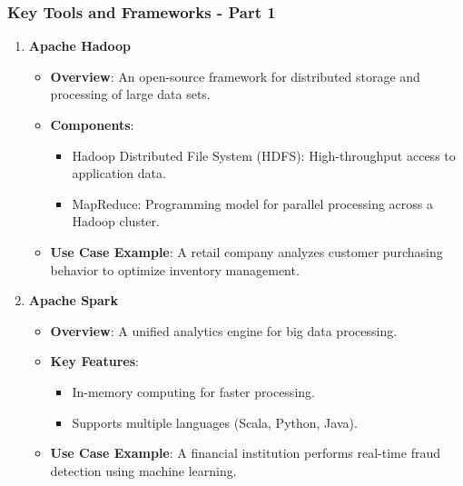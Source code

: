 \documentclass[aspectratio=169]{beamer}
\begin{document}
\begin{frame}[fragile]
    \frametitle{Key Tools and Frameworks - Part 1}
    \begin{enumerate}
        \item \textbf{Apache Hadoop}
        \begin{itemize}
            \item \textbf{Overview}: An open-source framework for distributed storage and processing of large data sets.
            \item \textbf{Components}:
            \begin{itemize}
                \item Hadoop Distributed File System (HDFS): High-throughput access to application data.
                \item MapReduce: Programming model for parallel processing across a Hadoop cluster.
            \end{itemize}
            \item \textbf{Use Case Example}: A retail company analyzes customer purchasing behavior to optimize inventory management.
        \end{itemize}

        \item \textbf{Apache Spark}
        \begin{itemize}
            \item \textbf{Overview}: A unified analytics engine for big data processing.
            \item \textbf{Key Features}:
            \begin{itemize}
                \item In-memory computing for faster processing.
                \item Supports multiple languages (Scala, Python, Java).
            \end{itemize}
            \item \textbf{Use Case Example}: A financial institution performs real-time fraud detection using machine learning.
        \end{itemize}
    \end{enumerate}
\end{frame}
\end{document}
